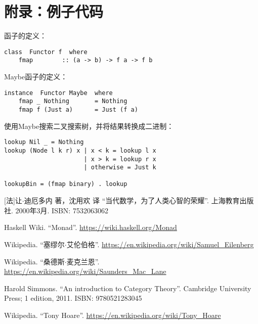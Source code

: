 \documentclass{article}
\begin{document}
\section{附录：例子代码}

函子的定义：

\lstset{frame=single}
\begin{lstlisting}[style=Haskell]
class  Functor f  where
    fmap        :: (a -> b) -> f a -> f b
\end{lstlisting}

Maybe函子的定义：

\begin{lstlisting}
instance  Functor Maybe  where
    fmap _ Nothing       = Nothing
    fmap f (Just a)      = Just (f a)
\end{lstlisting}

使用Maybe搜索二叉搜索树，并将结果转换成二进制：

\begin{lstlisting}[style=Haskell]
lookup Nil _ = Nothing
lookup (Node l k r) x | x < k = lookup l x
                      | x > k = lookup r x
                      | otherwise = Just k

lookupBin = (fmap binary) . lookup
\end{lstlisting}

\ifx\wholebook\relax \else
\begin{thebibliography}{99}

[法]让$\cdot$迪厄多内 著，沈用欢 译 ``当代数学，为了人类心智的荣耀''. 上海教育出版社. 2000年3月. ISBN: 7532063062

Haskell Wiki. ``Monad''. \url{https://wiki.haskell.org/Monad}

Wikipedia. ``塞缪尔$\cdot$艾伦伯格''. \url{https://en.wikipedia.org/wiki/Samuel_Eilenberg}

Wikipedia. ``桑德斯$\cdot$麦克兰恩''. \url{https://en.wikipedia.org/wiki/Saunders_Mac_Lane}

Harold Simmons. ``An introduction to Category Theory''.  Cambridge University Press; 1 edition, 2011. ISBN: 9780521283045

Wikipedia. ``Tony Hoare''. \url{https://en.wikipedia.org/wiki/Tony_Hoare}

\end{thebibliography}

\expandafter\enddocument

\fi
\end{document}
